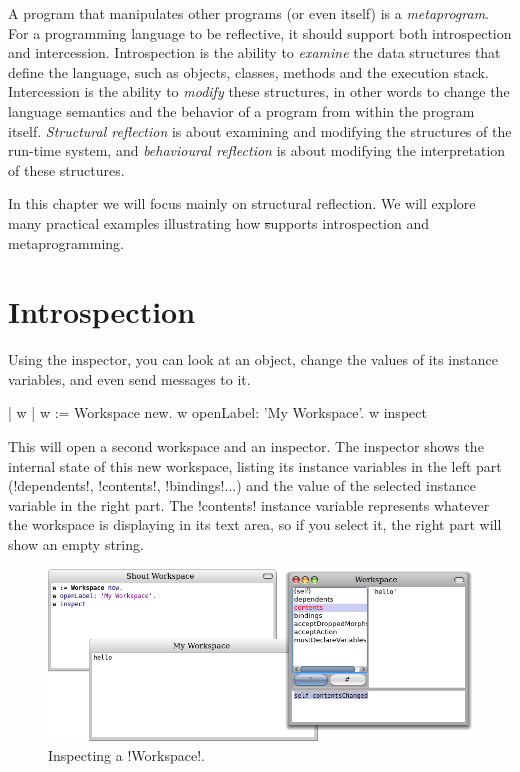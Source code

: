 \documentclass[a4paper,10pt,twoside]{book}
\begin{document}
A program that manipulates other programs (or even itself) is a \emph{metaprogram}.
For a programming language to be reflective, it should support both introspection and intercession.
Introspection is the ability to \emph{examine} the data structures that define the language, such as objects, classes, methods and the execution stack.
Intercession is the ability to \emph{modify} these structures, in other words to change the language semantics and the behavior of a program from within the program itself.
\emph{Structural reflection} is about examining and modifying the structures of the run-time system, and \emph{behavioural reflection} is about modifying the interpretation of these structures.

In this chapter we will focus mainly on structural reflection.
We will explore many practical examples illustrating how \st supports introspection and metaprogramming.

\section{Introspection}

Using the inspector, you can look at an object, change the values of its instance variables, and even send messages to it.

\begin{code}{| w |}
w := Workspace new.
w openLabel: 'My Workspace'.
w inspect
\end{code}

This will open a second workspace and an inspector.
The inspector shows the internal state of this new workspace, listing its instance variables in the left part (\ct!dependents!, \ct!contents!, \ct!bindings!...) and the value of the selected instance variable in the right part.
The \ct!contents! instance variable represents whatever the workspace is displaying in its text area, so if you select it, the right part will show an empty string.

\begin{figure}[ht]\centering
	\includegraphics[width=\linewidth]{workspaceInspector}
	\caption{Inspecting a \ct!Workspace!.}
\end{figure}
\end{document}
